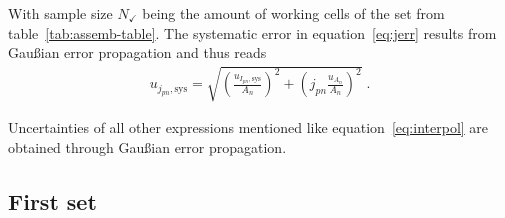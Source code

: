\documentclass[a4paper,10pt,twocolumn]{article}
\begin{document}
\begin{extract*}
With sample size $N_\checkmark$ being the amount of working cells of the set from table~\ref{tab:assemb-table}. The systematic error in equation~\ref{eq:jerr} results from Gaußian error propagation and thus reads
\begin{align}
	u_{j_{pn},\text{sys}} = \sqrt{ \left( \frac{ u_{I_{pn},\text{sys}}}{A_n}\right)^2+\left(j_{pn}\frac{u_{A_n}}{A_n} \right)^2}\;.
\end{align}

Uncertainties of all other expressions mentioned like equation~\ref{eq:interpol} are obtained through Gaußian error propagation.

\subsection{First set}\label{subsec:S1data}


\end{extract*}
\end{document}
